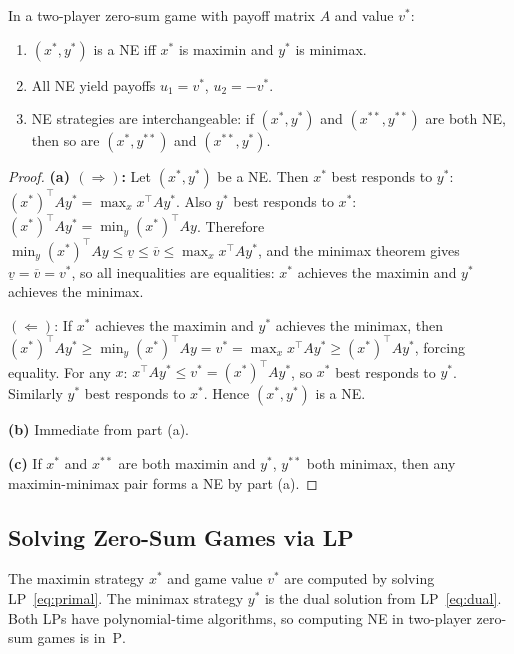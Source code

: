 \documentclass[11pt,a4paper]{article}
\begin{document}
\begin{corollary}
\label{cor:ne_zero_sum}
In a two-player zero-sum game with payoff matrix $A$ and value $v^*$:
\begin{enumerate}[nosep,label=(\alph*)]
    \item $(x^*, y^*)$ is a NE iff $x^*$ is maximin and $y^*$ is minimax.
    \item All NE yield payoffs $u_1 = v^*$, $u_2 = -v^*$.
    \item NE strategies are interchangeable: if $(x^*, y^*)$ and
    $(x^{**}, y^{**})$ are both NE, then so are $(x^*, y^{**})$ and
    $(x^{**}, y^*)$.
\end{enumerate}
\end{corollary}

\begin{proof}
\textbf{(a) $(\Rightarrow)$:} Let $(x^*, y^*)$ be a NE. Then
$x^*$ best responds to $y^*$: $(x^*)^\top A y^* = \max_x x^\top A y^*$.
Also $y^*$ best responds to $x^*$: $(x^*)^\top A y^* = \min_y (x^*)^\top Ay$.
Therefore
$\min_y (x^*)^\top Ay \leq \underline{v} \leq \overline{v}
\leq \max_x x^\top Ay^*$,
and the minimax theorem gives $\underline{v} = \overline{v} = v^*$, so all
inequalities are equalities: $x^*$ achieves the maximin and $y^*$ achieves
the minimax.

$(\Leftarrow)$: If $x^*$ achieves the maximin and $y^*$ achieves the
minimax, then $(x^*)^\top Ay^* \geq \min_y (x^*)^\top Ay = v^*
= \max_x x^\top Ay^* \geq (x^*)^\top Ay^*$, forcing equality. For any $x$:
$x^\top Ay^* \leq v^* = (x^*)^\top Ay^*$, so $x^*$ best responds to $y^*$.
Similarly $y^*$ best responds to $x^*$. Hence $(x^*, y^*)$ is a NE.

\textbf{(b)} Immediate from part (a).

\textbf{(c)} If $x^*$ and $x^{**}$ are both maximin and $y^*$, $y^{**}$
both minimax, then any maximin-minimax pair forms a NE by part (a).
\end{proof}

\subsection{Solving Zero-Sum Games via LP}
\label{subsec:lp}

\begin{proposition}
\label{prop:lp_zerosum}
The maximin strategy $x^*$ and game value $v^*$ are computed by solving
LP~\eqref{eq:primal}. The minimax strategy $y^*$ is the dual solution from
LP~\eqref{eq:dual}. Both LPs have polynomial-time algorithms, so computing
NE in two-player zero-sum games is in~$\mathrm{P}$.
\end{proposition}
\end{document}
